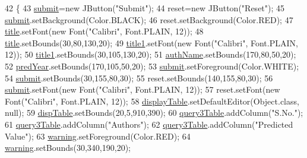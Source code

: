 \begin{DoxyCode}
42     \{
43         \hyperlink{classGUIQuery_a6580b15e365bc754c1a5ccdd2d58a4bb}{submit}=\textcolor{keyword}{new} JButton(\textcolor{stringliteral}{"Submit"});
44         reset=\textcolor{keyword}{new} JButton(\textcolor{stringliteral}{"Reset"});
45         \hyperlink{classGUIQuery_a6580b15e365bc754c1a5ccdd2d58a4bb}{submit}.setBackground(Color.BLACK);
46         reset.setBackground(Color.RED);
47         \hyperlink{classGuiQuery3_a7e581a0af7c5a7aafe78127499af4ea6}{title}.setFont(\textcolor{keyword}{new} Font(\textcolor{stringliteral}{"Calibri"}, Font.PLAIN, 12));
48         \hyperlink{classGuiQuery3_a7e581a0af7c5a7aafe78127499af4ea6}{title}.setBounds(30,80,130,20);
49         \hyperlink{classGuiQuery3_a9edee5c70fc9ce109601436c5556675f}{title1}.setFont(\textcolor{keyword}{new} Font(\textcolor{stringliteral}{"Calibri"}, Font.PLAIN, 12));
50         \hyperlink{classGuiQuery3_a9edee5c70fc9ce109601436c5556675f}{title1}.setBounds(30,105,130,20);
51         \hyperlink{classGuiQuery3_aa3273681bd3a7b3b44b36fd2b2fddcd4}{authName}.setBounds(170,80,50,20);
52         \hyperlink{classGuiQuery3_afedb6af40be4ff198922c85bbe94716f}{predYear}.setBounds(170,105,50,20);
53         \hyperlink{classGUIQuery_a6580b15e365bc754c1a5ccdd2d58a4bb}{submit}.setForeground(Color.WHITE);
54         \hyperlink{classGUIQuery_a6580b15e365bc754c1a5ccdd2d58a4bb}{submit}.setBounds(30,155,80,30);
55         reset.setBounds(140,155,80,30);
56         \hyperlink{classGUIQuery_a6580b15e365bc754c1a5ccdd2d58a4bb}{submit}.setFont(\textcolor{keyword}{new} Font(\textcolor{stringliteral}{"Calibri"}, Font.PLAIN, 12));
57         reset.setFont(\textcolor{keyword}{new} Font(\textcolor{stringliteral}{"Calibri"}, Font.PLAIN, 12));
58         \hyperlink{classGuiQuery3_a868222082fb015a87bac64a3c671389d}{displayTable}.setDefaultEditor(Object.class, null);
59         \hyperlink{classGuiQuery3_acd36b4ab5f212d4a4fae20d4a8ffcba4}{dispTable}.setBounds(20,5,910,390);
60         \hyperlink{classGuiQuery3_a8273c6d7086d34e6f91fc9721af410d9}{query3Table}.addColumn(\textcolor{stringliteral}{"S.No."});
61         \hyperlink{classGuiQuery3_a8273c6d7086d34e6f91fc9721af410d9}{query3Table}.addColumn(\textcolor{stringliteral}{"Authors"});
62         \hyperlink{classGuiQuery3_a8273c6d7086d34e6f91fc9721af410d9}{query3Table}.addColumn(\textcolor{stringliteral}{"Predicted Value"});
63         \hyperlink{classGuiQuery3_a2452813fd6a5ff8c945ccadde7ad4853}{warning}.setForeground(Color.RED);
64         \hyperlink{classGuiQuery3_a2452813fd6a5ff8c945ccadde7ad4853}{warning}.setBounds(30,340,190,20);

\end{DoxyCode}
